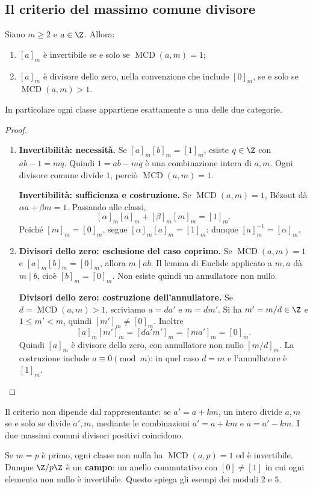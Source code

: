 \subsection{Il criterio del massimo comune divisore}
\begin{teorema}\label{teo:unita-modulari}
Siano $m\ge2$ e $a\in\Z$. Allora:
\begin{enumerate}
\item $[a]_m$ è invertibile se e solo se $\operatorname{MCD}(a,m)=1$;
\item $[a]_m$ è divisore dello zero, nella convenzione che include $[0]_m$, se e solo se $\operatorname{MCD}(a,m)>1$.
\end{enumerate}
In particolare ogni classe appartiene esattamente a una delle due categorie.
\end{teorema}
\begin{proof}
\begin{enumerate}[label=\arabic*.]
\item \textbf{Invertibilità: necessità.} Se $[a]_m[b]_m=[1]_m$, esiste $q\in\Z$ con $ab-1=mq$. Quindi $1=ab-mq$ è una combinazione intera di $a,m$. Ogni divisore comune divide $1$, perciò $\operatorname{MCD}(a,m)=1$.

\textbf{Invertibilità: sufficienza e costruzione.} Se $\operatorname{MCD}(a,m)=1$, Bézout dà $\alpha a+\beta m=1$. Passando alle classi,
\[
[\alpha]_m[a]_m+[\beta]_m[m]_m=[1]_m.
\]
Poiché $[m]_m=[0]_m$, segue $[\alpha]_m[a]_m=[1]_m$: dunque $[a]_m^{-1}=[\alpha]_m$.
\item \textbf{Divisori dello zero: esclusione del caso coprimo.} Se $\operatorname{MCD}(a,m)=1$ e $[a]_m[b]_m=[0]_m$, allora $m\mid ab$. Il lemma di Euclide applicato a $m,a$ dà $m\mid b$, cioè $[b]_m=[0]_m$. Non esiste quindi un annullatore non nullo.

\textbf{Divisori dello zero: costruzione dell'annullatore.} Se $d=\operatorname{MCD}(a,m)>1$, scriviamo $a=da'$ e $m=dm'$. Si ha $m'=m/d\in\Z$ e $1\le m'<m$, quindi $[m']_m\ne[0]_m$. Inoltre
\[
[a]_m[m']_m=[da'm']_m=[ma']_m=[0]_m.
\]
Quindi $[a]_m$ è divisore dello zero, con annullatore non nullo $[m/d]_m$. La costruzione include $a\equiv0\pmod m$: in quel caso $d=m$ e l'annullatore è $[1]_m$.
\end{enumerate}
\end{proof}

\begin{osservazione}
Il criterio non dipende dal rappresentante: se $a'=a+km$, un intero divide $a,m$ se e solo se divide $a',m$, mediante le combinazioni $a'=a+km$ e $a=a'-km$. I due massimi comuni divisori positivi coincidono.

Se $m=p$ è primo, ogni classe non nulla ha $\operatorname{MCD}(a,p)=1$ ed è invertibile. Dunque $\Z/p\Z$ è un \textbf{campo}: un anello commutativo con $[0]\ne[1]$ in cui ogni elemento non nullo è invertibile. Questo spiega gli esempi dei moduli $2$ e $5$.
\end{osservazione}

